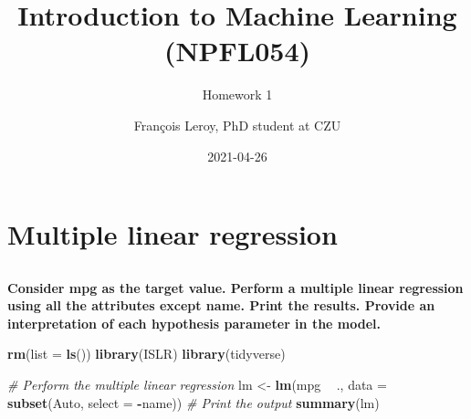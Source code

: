 \documentclass[
  12pt,
  oneside]{report}
\title{Introduction to Machine Learning\\
(NPFL054)}
\subtitle{Homework 1}
\author{François Leroy, PhD student at CZU}
\date{2021-04-26}
\newenvironment{Shaded}{\begin{snugshade}}{\end{snugshade}}
\newcommand{\CommentTok}[1]{\textcolor[rgb]{0.56,0.35,0.01}{\textit{#1}}}
\newcommand{\DataTypeTok}[1]{\textcolor[rgb]{0.13,0.29,0.53}{#1}}
\newcommand{\KeywordTok}[1]{\textcolor[rgb]{0.13,0.29,0.53}{\textbf{#1}}}
\newcommand{\NormalTok}[1]{#1}
\newcommand{\OperatorTok}[1]{\textcolor[rgb]{0.81,0.36,0.00}{\textbf{#1}}}
\newcommand{\StringTok}[1]{\textcolor[rgb]{0.31,0.60,0.02}{#1}}
\begin{document}
\maketitle


\cleardoublepage 
{}

{
\hypersetup{linkcolor=}
\setcounter{tocdepth}{1}
\tableofcontents
\newpage
}
\vspace{50mm}


\cleardoublepage 
{}


\hypertarget{q1}{%
\chapter{Multiple linear regression}\label{q1}}

\hypertarget{section}{%
\section{}\label{section}}

\textbf{Consider mpg as the target value. Perform a multiple linear regression using all the attributes
except name. Print the results. Provide an interpretation of each hypothesis parameter in
the model.}

\begin{Shaded}
\begin{Highlighting}[]
\KeywordTok{rm}\NormalTok{(}\DataTypeTok{list =} \KeywordTok{ls}\NormalTok{())}
\KeywordTok{library}\NormalTok{(ISLR)}
\KeywordTok{library}\NormalTok{(tidyverse)}
\end{Highlighting}
\end{Shaded}

\begin{Shaded}
\begin{Highlighting}[]
\CommentTok{# Perform the multiple linear regression}
\NormalTok{lm <-}\StringTok{ }
\StringTok{  }\KeywordTok{lm}\NormalTok{(mpg }\OperatorTok{~}\StringTok{ }\NormalTok{., }\DataTypeTok{data =} \KeywordTok{subset}\NormalTok{(Auto, }\DataTypeTok{select =} \OperatorTok{-}\NormalTok{name))}
\CommentTok{# Print the output}
\KeywordTok{summary}\NormalTok{(lm)}
\end{Highlighting}
\end{Shaded}
\end{document}
